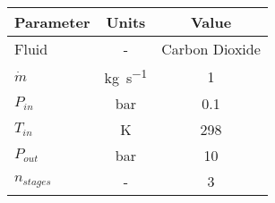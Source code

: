 \begin{tabular}{|p{2.5cm} c c|}
    \hline
    \rowcolor{bluepoli!40} %
    \textbf{Parameter} & \textbf{Units} & \textbf{Value} \T\B \\
    \hline \hline
    Fluid  & - & Carbon Dioxide \T\B\\
    \(\Dot{m}\)  & \unit{\kg\per\s} & \num{1} \T\B\\
    \(P_{in}\) & \unit{\bar} & \num{0.1} \T\B\\
    \(T_{in}\) & \unit{\K} & \num{298} \T\B\\
    \(P_{out}\) & \unit{\bar} & \num{10} \T\B\\   
    \(n_{stages}\) & - & \num{3} \T\B\\ 
    \hline
\end{tabular}